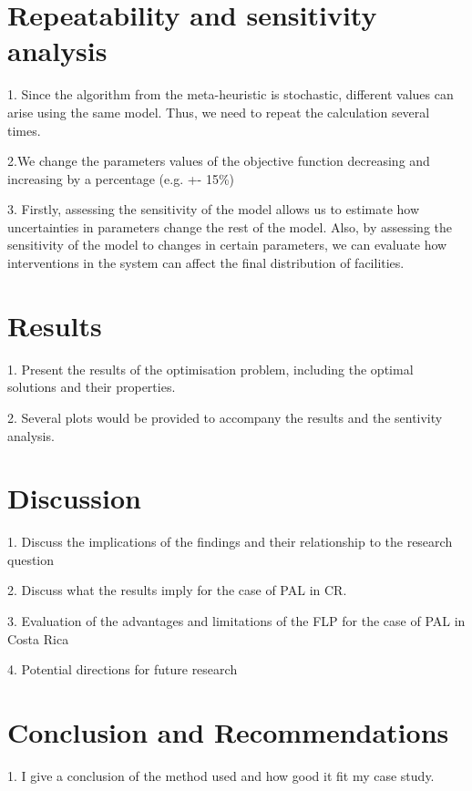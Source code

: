
\section{Repeatability and sensitivity analysis} 

1. Since the algorithm from the meta-heuristic is stochastic, different values can arise using the same model. Thus, we need to repeat the calculation several times.

2.We change the parameters values of the objective function decreasing and increasing by a percentage (e.g. +- 15\%)

3. Firstly, assessing the sensitivity of the model allows us to estimate how uncertainties in parameters change the rest of the model. Also, by assessing the sensitivity of the model to changes in certain parameters, we can evaluate how interventions in the system can affect the final distribution of facilities.

\section{Results}

1. Present the results of the optimisation problem, including the optimal solutions and their properties.

2. Several plots would be provided to accompany the results and the sentivity analysis.

\section{Discussion}

1. Discuss the implications of the findings and their relationship to the research question

2. Discuss what the results imply for the case of PAL in CR.

3. Evaluation of the advantages and limitations of the FLP for the case of PAL in Costa Rica

4. Potential directions for future research 

\section{Conclusion and Recommendations}

1. I give a conclusion of the method used and how good it fit my case study.

